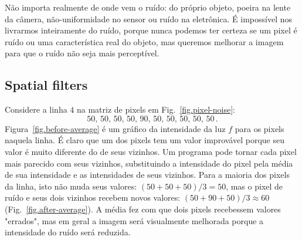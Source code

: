 
Não importa realmente de onde vem o ruído: do próprio objeto, poeira na lente da câmera, não-uniformidade no sensor ou ruído na eletrônica. É impossível nos livrarmos inteiramente do ruído, porque nunca podemos ter certeza se um pixel é ruído ou uma característica real do objeto, mas queremos melhorar a imagem para que o ruído não seja mais perceptível.

\subsection{Spatial filters}

Considere a linha $4$ na matriz de pixels em Fig.~\ref{fig.pixel-noise}:
\[
50,\, 50,\, 50,\,50,\, 90,\, 50,\, 50,\, 50,\, 50,\, 50\,.
\]
Figura~\ref{fig.before-average} é um gráfico da intensidade da luz $f$ para os pixels naquela linha. É claro que um dos pixels tem um valor improvável porque seu valor é muito diferente do de seus vizinhos. Um programa pode tornar cada pixel mais parecido com seus vizinhos, substituindo a intensidade do pixel pela média de sua intensidade e as intensidades de seus vizinhos. Para a maioria dos pixels da linha, isto não muda seus valores: $(50+50+50)/3=50$, mas o pixel de ruído e seus dois vizinhos recebem novos valores: $(50+90+50)/3\approx 60$ (Fig.~\ref{fig.after-average}). A média fez com que dois pixels recebessem valores "errados", mas em geral a imagem será visualmente melhorada porque a intensidade do ruído será reduzida.

